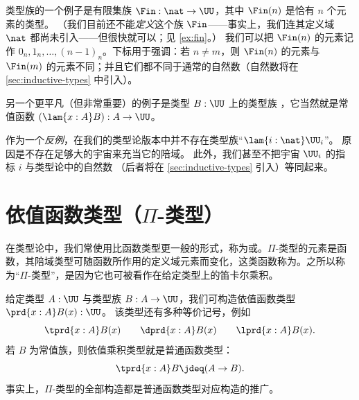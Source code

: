 %
类型族的一个例子是有限集族 $\Fin : \nat \to \UU$，其中 $\Fin(n)$ 是恰有 $n$ 个元素的类型。
（我们目前还不能\emph{定义}这个族 $\Fin$——事实上，我们连其定义域 $\nat$ 都尚未引入——但很快就可以；见 \cref{ex:fin}。）
我们可以把 $\Fin(n)$ 的元素记作 $0_n,1_n,\dots,(n-1)_n$。下标用于强调：若 $n \neq m$，则 $\Fin(n)$ 的元素与 $\Fin(m)$ 的元素不同；并且它们都不同于通常的自然数（自然数将在 \cref{sec:inductive-types} 中引入）。
%

另一个更平凡（但非常重要）的例子是类型 $B:\UU$ 上的类型族
%
%
，它当然就是常值函数 $(\lam{x:A} B):A\to\UU$。

作为一个\emph{反例}，在我们的类型论版本中并不存在类型族“$\lam{i:\nat} \UU_i$”。
原因是不存在足够大的宇宙来充当它的陪域。
此外，我们甚至不把宇宙 $\UU_i$ 的指标 $i$ 与类型论中的自然数 \nat（后者将在 \cref{sec:inductive-types} 引入）等同起来。

%

\section{依值函数类型（\texorpdfstring{$\Pi$}{Π}-类型）}
\label{sec:pi-types}

%
%
%
%
%
在类型论中，我们常使用比函数类型更一般的形式，称为或。$\Pi$-类型的元素是函数，其陪域类型可随函数所作用的定义域元素而变化，这类函数称为。之所以称为“$\Pi$-类型”，是因为它也可被看作在给定类型上的笛卡尔乘积。

给定类型 $A:\UU$ 与类型族 $B:A \to \UU$，我们可构造依值函数类型 $\prd{x:A}B(x) : \UU$。
该类型还有多种等价记号，例如
\[ \tprd{x:A} B(x) \qquad \dprd{x:A}B(x) \qquad \lprd{x:A} B(x). \]
若 $B$ 为常值族，则依值乘积类型就是普通函数类型：
\[\tprd{x:A} B \jdeq (A \to B).\]
事实上，$\Pi$-类型的全部构造都是普通函数类型对应构造的推广。

